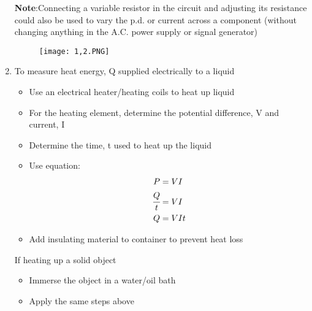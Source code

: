 \documentclass{article}
\begin{document}
\begin{enumerate}
\textbf{Note}:Connecting a variable resistor in the circuit and adjusting its resistance could also
be used to vary the p.d. or current across a component (without changing anything in the
A.C. power supply or signal generator)
\begin{figure}[H]
    \centering
    \texttt{[image: 1,2.PNG]}
\end{figure}

\item To measure heat energy, Q supplied electrically to a liquid

\begin{itemize}
    \item Use an electrical heater/heating coils to heat up liquid
\item  For the heating element, determine the potential difference, V and current, I
\item  Determine the time, t used to heat up the liquid
\item Use equation: 
\begin{align*}
    P&=VI \\ 
    \cfrac{Q}{t}&=VI \\ 
    Q&=VIt
\end{align*}
\item Add insulating material to container to prevent heat loss
\end{itemize}

If heating up a solid object
\begin{itemize}
    \item Immerse the object in a water/oil bath
\item Apply the same steps above
\end{itemize}
\end{enumerate}
\end{document}
